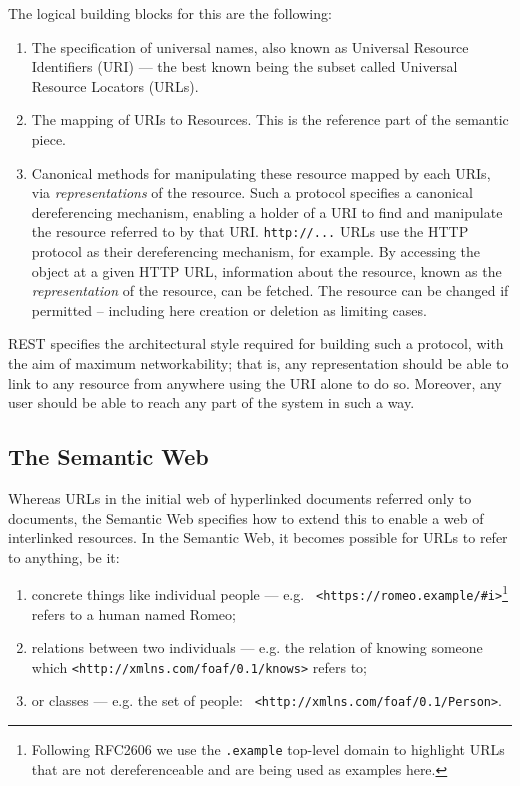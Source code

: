 \documentclass{llncs}
\begin{document}
The logical building blocks for this are the following:
\begin{enumerate}
\item The specification of universal names, also known as Universal
  Resource Identifiers (URI) --- the best known being the subset
  called Universal Resource Locators (URLs).
\item The mapping of URIs to Resources. This is the reference part of
  the semantic piece.
\item Canonical methods for manipulating these resource mapped by each
  URIs, via {\em representations} of the resource.  Such a protocol
  specifies a canonical dereferencing mechanism, enabling a holder of
  a URI to find and manipulate the resource referred to by that URI.
  {\tt http://...} URLs use the HTTP protocol as their dereferencing
  mechanism, for example.  By accessing the object at a given HTTP
  URL, information about the resource, known as the {\em
    representation} of the resource, can be fetched.  The resource can
  be changed if permitted -- including here creation or deletion as
  limiting cases.
\end{enumerate}

REST specifies the architectural style required for building such a
protocol, with the aim of maximum networkability; that is, any
representation should be able to link to any resource from anywhere
using the URI alone to do so. Moreover, any user should be able to
reach any part of the system in such a way.

\subsection{The Semantic Web}

Whereas URLs in the initial web of hyperlinked documents referred only
to documents, the Semantic Web specifies how to extend this to enable
a web of interlinked resources. In the Semantic Web, it becomes
possible for URLs to refer to anything, be it:
\begin{enumerate}
\item concrete things like individual people --- e.g. {\tt
  <https://romeo.example/\#i>}\footnote{Following RFC2606\cite{rfc2606} we use the {\tt .example} top-level
  domain to highlight URLs that are not dereferenceable and are being used as examples here.} refers to
  a human named Romeo;
\item relations between two individuals --- e.g. the relation of
  knowing someone which {\tt <http://xmlns.com/foaf/0.1/knows>} refers
  to;
\item or classes --- e.g. the set of people: {\tt
  <http://xmlns.com/foaf/0.1/Person>}.
\end{enumerate}
\end{document}
